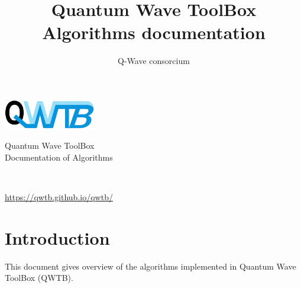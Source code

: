 \documentclass[12pt,a4paper,oneside]{report} %
\begin{document}
\renewcommand\floatpagefraction{.9} \renewcommand\topfraction{.9} \renewcommand\bottomfraction{.9} \renewcommand\textfraction{.1} \setcounter{totalnumber}{50} \setcounter{topnumber}{50} \setcounter{bottomnumber}{50} %
\renewcommand{\labelitemi}{--}          %
\setlength{\unitlength}{1mm}            %

\newenvironment{tightdesc}{\begin{description}[itemsep=0pt]} 
                              {\end{description}}

\def\infosection{Description}
\def\examplesection{Example}
\renewcommand{\chaptername}{}

\title{Quantum Wave ToolBox Algorithms documentation}
\author{Q-Wave consorcium}

\thispagestyle{empty}
\begin{center}
        \vspace*{10em}
        {\huge
        \includegraphics[width=0.3\textwidth]{logo/qwtb_logo.png}

        \vspace{0.5em}
        Quantum Wave ToolBox\\

        \vspace{1.5em}
        Documentation of Algorithms}\\

        \vfill
        {\Large \color{red}{QWTB version 0.1}}

        \vspace{1em}
        {\Large \url{https://qwtb.github.io/qwtb/}}
\end{center}
\newpage

\tableofcontents

\chapter{Introduction} %
This document gives overview of the algorithms implemented in Quantum Wave ToolBox (QWTB).
\end{document}
